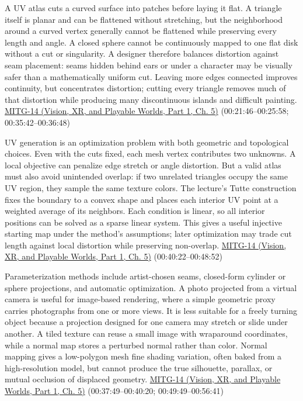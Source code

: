 A UV atlas cuts a curved surface into patches before laying it flat. A triangle itself is planar and can be flattened without stretching, but the neighborhood around a curved vertex generally cannot be flattened while preserving every length and angle. A closed sphere cannot be continuously mapped to one flat disk without a cut or singularity. A designer therefore balances distortion against seam placement: seams hidden behind ears or under a character may be visually safer than a mathematically uniform cut. Leaving more edges connected improves continuity, but concentrates distortion; cutting every triangle removes much of that distortion while producing many discontinuous islands and difficult painting. \href{../07-Vision-XR-and-Playable-Worlds-P01/main.pdf\#04-visual-computing-ii-ch036-mitg-14---texture-mapping}{MITG-14 (Vision, XR, and Playable Worlds, Part 1, Ch. 5)} (00:21:46--00:25:58; 00:35:42--00:36:48)

UV generation is an optimization problem with both geometric and topological choices. Even with the cuts fixed, each mesh vertex contributes two unknowns. A local objective can penalize edge stretch or angle distortion. But a valid atlas must also avoid unintended overlap: if two unrelated triangles occupy the same UV region, they sample the same texture colors. The lecture's Tutte construction fixes the boundary to a convex shape and places each interior UV point at a weighted average of its neighbors. Each condition is linear, so all interior positions can be solved as a sparse linear system. This gives a useful injective starting map under the method's assumptions; later optimization may trade cut length against local distortion while preserving non-overlap. \href{../07-Vision-XR-and-Playable-Worlds-P01/main.pdf\#04-visual-computing-ii-ch036-mitg-14---texture-mapping}{MITG-14 (Vision, XR, and Playable Worlds, Part 1, Ch. 5)} (00:40:22--00:48:52)

Parameterization methods include artist-chosen seams, closed-form cylinder or sphere projections, and automatic optimization. A photo projected from a virtual camera is useful for image-based rendering, where a simple geometric proxy carries photographs from one or more views. It is less suitable for a freely turning object because a projection designed for one camera may stretch or slide under another. A tiled texture can reuse a small image with wraparound coordinates, while a normal map stores a perturbed normal rather than color. Normal mapping gives a low-polygon mesh fine shading variation, often baked from a high-resolution model, but cannot produce the true silhouette, parallax, or mutual occlusion of displaced geometry. \href{../07-Vision-XR-and-Playable-Worlds-P01/main.pdf\#04-visual-computing-ii-ch036-mitg-14---texture-mapping}{MITG-14 (Vision, XR, and Playable Worlds, Part 1, Ch. 5)} (00:37:49--00:40:20; 00:49:49--00:56:41)

